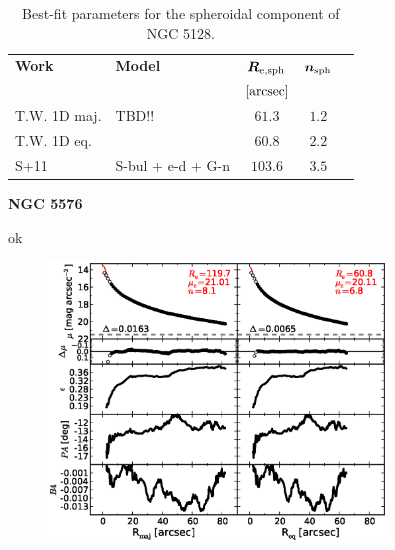 \documentclass[preprint2]{emulateapj}
\newcommand{\fitfigurewidth}{0.8\textwidth}
\begin{document}
  \begin{table}[h]
  \small
  \caption{Best-fit parameters for the spheroidal component of NGC 5128.}
  \begin{center}
  \begin{tabular}{llccc}
  \hline
  {\bf Work} & {\bf Model}   & $\bm R_{\rm e,sph}$    & $\bm n_{\rm sph}$ \\
    &  &  $[\rm arcsec]$ & \\
  \hline
  T.W. 1D maj. & TBD!! & $61.3$  &  $1.2$ \\
  T.W. 1D eq.  &  & $60.8$  &  $2.2$ \\
  \hline
  S+11         & S-bul + e-d + G-n & $103.6$  &  $3.5$ \\
  \hline
  \end{tabular}
  \end{center}
  \label{tab:n5128}
  \end{table}



  \clearpage\newpage\noindent

  {\bf NGC 5576 \\}

  ok

  \begin{figure}[h]
  \begin{center}
  \includegraphics[width=\fitfigurewidth]{images/n4889_1Dfit.eps}
  \caption{}
  \end{center}
  \end{figure}
\end{document}
